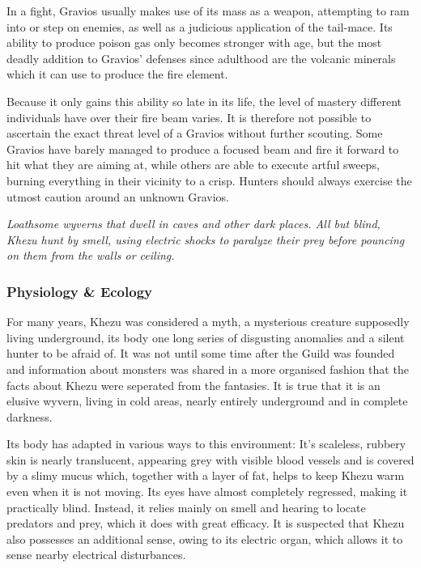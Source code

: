 In a fight, Gravios usually makes use of its mass as a weapon, attempting to ram into or step on enemies, as well as a judicious application of the tail-mace. Its ability to produce poison gas only becomes stronger with age, but the most deadly addition to Gravios' defenses since adulthood are the volcanic minerals which it can use to produce the fire element.

Because it only gains this ability so late in its life, the level of mastery different individuals have over their fire beam varies. It is therefore not possible to ascertain the exact threat level of a Gravios without further scouting. Some Gravios have barely managed to produce a focused beam and fire it forward to hit what they are aiming at, while others are able to execute artful sweeps, burning everything in their vicinity to a crisp. Hunters should always exercise the utmost caution around an unknown Gravios.

\textit{Loathsome wyverns that dwell in caves and other dark places. All but blind, Khezu hunt by smell, using electric shocks to paralyze their prey before pouncing on them from the walls or ceiling.}%
\subsubsection{Physiology \& Ecology}
For many years, Khezu was considered a myth, a mysterious creature supposedly living underground, its body one long series of disgusting anomalies and a silent hunter to be afraid of. It was not until some time after the Guild was founded and information about monsters was shared in a more organised fashion that the facts about Khezu were seperated from the fantasies. It is true that it is an elusive wyvern, living in cold areas, nearly entirely underground and in complete darkness.

Its body has adapted in various ways to this environment: It's scaleless, rubbery skin is nearly translucent, appearing grey with visible blood vessels and is covered by a slimy mucus which, together with a layer of fat, helps to keep Khezu warm even when it is not moving. Its eyes have almost completely regressed, making it practically blind. Instead, it relies mainly on smell and hearing to locate predators and prey, which it does with great efficacy. It is suspected that Khezu also possesses an additional sense, owing to its electric organ, which allows it to sense nearby electrical disturbances.

